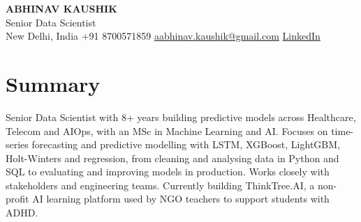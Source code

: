 \documentclass[10pt,a4paper]{article}
\begin{document}
\begin{center}
  {\LARGE\bfseries ABHINAV KAUSHIK}\\[2pt]
  {\large Senior Data Scientist}\\[2pt]
  New Delhi, India \textbar{} +91 8700571859 \textbar{} \href{mailto:aabhinav.kaushik@gmail.com}{aabhinav.kaushik@gmail.com} \textbar{} \href{https://www.linkedin.com/in/abhinav-kaushik10/}{LinkedIn}  
\end{center}

\section{Summary}
Senior Data Scientist with 8+ years building predictive models across Healthcare, Telecom and AIOps, with an MSc in Machine Learning and AI. Focuses on time-series forecasting and predictive modelling with LSTM, XGBoost, LightGBM, Holt-Winters and regression, from cleaning and analysing data in Python and SQL to evaluating and improving models in production. Works closely with stakeholders and engineering teams. Currently building ThinkTree.AI, a non-profit AI learning platform used by NGO teachers to support students with ADHD.
\end{document}
